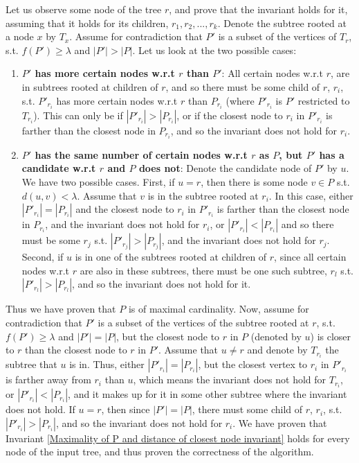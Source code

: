 \documentclass[11pt,a4paper]{article}
\theoremstyle{definition}
\theoremstyle{remark}
\begin{document}
Let us observe some node of the tree $r$, and prove that the invariant holds for it, assuming that it holds for its children, $r_{1},r_{2},...,r_{k}$. Denote the subtree rooted at a node $x$ by $T_x$. Assume for contradiction that $P'$ is a subset of the vertices of $T_r$, s.t. $f(P')\geq\lambda$ and $|P'| > |P|$. Let us look at the two possible cases:
\begin{enumerate}
\item \textbf{$P'$ has more certain nodes w.r.t $r$ than $P'$}: All certain nodes w.r.t $r$, are in subtrees rooted at children of $r$, and so there must be some child of $r$, $r_i$, s.t. $P'_{r_i}$ has more certain nodes w.r.t $r$ than $P_{r_i}$ (where $P'_{r_i}$ is $P'$ restricted to $T_{r_i}$). This can only be if $|P'_{r_i}| > |P_{r_i}|$, or if the closest node to $r_i$ in $P'_{r_i}$ is farther than the closest node in $P_{r_i}$, and so the invariant does not hold for $r_i$.
\item \textbf{$P'$ has the same number of certain nodes w.r.t $r$ as $P$, but $P'$ has a candidate w.r.t $r$  and $P$ does not}: Denote the candidate node of $P'$ by $u$. We have two possible cases. First, if $u=r$, then there is some node $v \in P$ s.t. $d(u,v)<\lambda$. Assume that $v$ is in the subtree rooted at $r_i$. In this case, either $|P'_{r_i}|=|P_{r_i}|$ and the closest node to $r_i$ in $P'_{r_i}$ is farther than the closest node in $P_{r_i}$, and the invariant does not hold for $r_i$, or $|P'_{r_i}|<|P_{r_i}|$ and so there must be some $r_j$ s.t. $|P'_{r_j}|>|P_{r_j}|$, and the invariant does not hold for $r_j$. Second, if $u$ is in one of the subtrees rooted at children of $r$, since all certain nodes w.r.t $r$ are also in these subtrees, there must be one such subtree, $r_l$ s.t. $|P'_{r_l}| > |P_{r_l}|$, and so the invariant does not hold for it.
\end{enumerate} 
Thus we have proven that $P$ is of maximal cardinality. Now, assume for contradiction that $P'$ is a subset of the vertices of the subtree rooted at $r$, s.t. $f(P')\geq\lambda$ and $|P'| = |P|$, but the closest node to $r$ in $P$ (denoted by $u$) is closer to $r$ than the closest node to $r$ in $P'$. Assume that $u \neq r$ and denote by $T_{r_i}$ the subtree that $u$ is in. Thus, either $|P'_{r_i}| = |P_{r_i}|$, but the closest vertex to $r_i$ in $P'_{r_i}$ is farther away from $r_i$ than $u$, which means the invariant does not hold for $T_{r_i}$, or $|P'_{r_i}| < |P_{r_i}|$, and it makes up for it in some other subtree where the invariant does not hold. If $u=r$, then since $|P'| = |P|$, there must some child of $r$, $r_i$, s.t. $|P'_{r_i}| > |P_{r_i}|$, and so the invariant does not hold for $r_i$. We have proven that Invariant \ref{Maximality of P and distance of closest node invariant} holds for every node of the input tree, and thus proven the correctness of the algorithm.
\end{document}
